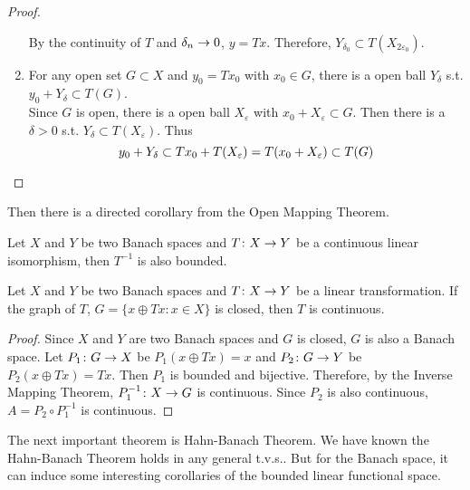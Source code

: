 \documentclass[a4paper,11pt]{report}
\begin{document}
\begin{proof}
\begin{enumerate}[label=\arabic*)]
\begin{equation*}
		\end{equation*}
		By the continuity of $T$ and $\delta_n \rightarrow 0$, $y=Tx$. Therefore, $Y_{\delta_0} \subset T(X_{2\varepsilon_0})$.
		\item For any open set $G \subset X$ and $y_0 = Tx_0$ with $x_0 \in G$, there is a open ball $Y_\delta$ s.t. $y_0 + Y_\delta \subset T(G)$.\\
		Since $G$ is open, there is a open ball $X_\varepsilon$ with $x_0+X_\varepsilon \subset G$. Then there is a $\delta > 0$ s.t. $Y_{\delta} \subset T(X_\varepsilon)$. Thus
		\begin{equation*}
			y_0+Y_{\delta} \subset Tx_0 + T(X_{\varepsilon}) = T(x_0 + X_{\varepsilon}) \subset T(G)  \qedhere
		\end{equation*}
	\end{enumerate}
\end{proof}

Then there is a directed corollary from the Open Mapping Theorem.
\begin{cor}
	Let $X$ and $Y$ be two Banach spaces and $T \colon X \rightarrow Y$ be a continuous linear isomorphism, then $T^{-1}$ is also bounded.
\end{cor}

\begin{cor}
	Let $X$ and $Y$ be two Banach spaces and $T \colon X \rightarrow Y$ be a linear transformation. If the graph of $T$, $G = \{x \oplus Tx \colon x \in X\}$ is closed, then $T$ is continuous.
\end{cor}
\begin{proof}
	Since $X$ and $Y$ are two Banach spaces and $G$ is closed, $G$ is also a Banach space. Let $P_1 \colon G \rightarrow X$ be $P_1(x \oplus Tx)=x$ and $P_2 \colon G \rightarrow Y$ be $P_2(x \oplus Tx)=Tx$. Then $P_1$ is bounded and bijective. Therefore, by the Inverse Mapping Theorem, $P_1^{-1} \colon X \rightarrow G$ is continuous. Since $P_2$ is also continuous, $A=P_2 \circ P_1^{-1}$ is continuous.
\end{proof}

The next important theorem is Hahn-Banach Theorem. We have known the Hahn-Banach Theorem holds in any general t.v.s.. But for the Banach space, it can induce some interesting corollaries of the bounded linear functional space. 
\end{document}
